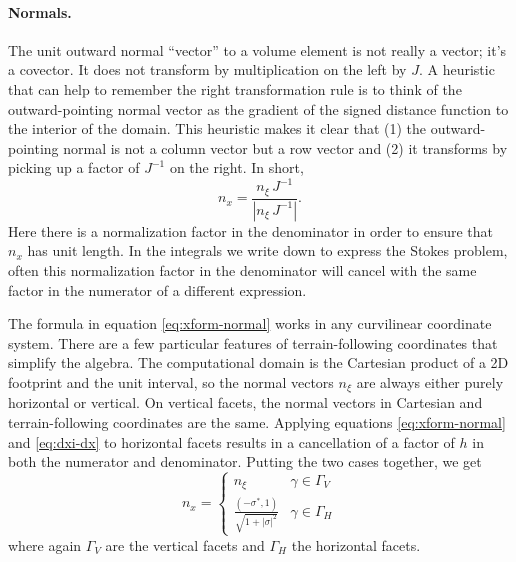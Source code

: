 \documentclass[gmd, manuscript]{copernicus}
\begin{document}
\paragraph{Normals.}
The unit outward normal ``vector'' to a volume element is not really a vector; it's a covector.
It does not transform by multiplication on the left by $J$.
A heuristic that can help to remember the right transformation rule is to think of the outward-pointing normal vector as the gradient of the signed distance function to the interior of the domain.
This heuristic makes it clear that (1) the outward-pointing normal is not a column vector but a row vector and (2) it transforms by picking up a factor of $J^{-1}$ on the right.
In short,
\begin{equation}
    n_x = \frac{n_\xi\,J^{-1}}{|n_\xi\,J^{-1}|}.
    \label{eq:xform-normal}
\end{equation}
Here there is a normalization factor in the denominator in order to ensure that $n_x$ has unit length.
In the integrals we write down to express the Stokes problem, often this normalization factor in the denominator will cancel with the same factor in the numerator of a different expression.

The formula in equation \eqref{eq:xform-normal} works in any curvilinear coordinate system.
There are a few particular features of terrain-following coordinates that simplify the algebra.
The computational domain is the Cartesian product of a 2D footprint and the unit interval, so the normal vectors $n_\xi$ are always either purely horizontal or vertical.
On vertical facets, the normal vectors in Cartesian and terrain-following coordinates are the same.
Applying equations \eqref{eq:xform-normal} and \eqref{eq:dxi-dx} to horizontal facets results in a cancellation of a factor of $h$ in both the numerator and denominator.
Putting the two cases together, we get
\begin{equation}
    n_x = \begin{cases}n_\xi & \gamma\in\Gamma_V \\ \frac{(-\sigma^*, 1)}{\sqrt{1 + |\sigma|^2}} & \gamma\in\Gamma_H \end{cases}
    \label{eq:xform-normal-tfc}
\end{equation}
where again $\Gamma_V$ are the vertical facets and $\Gamma_H$ the horizontal facets.
\end{document}
